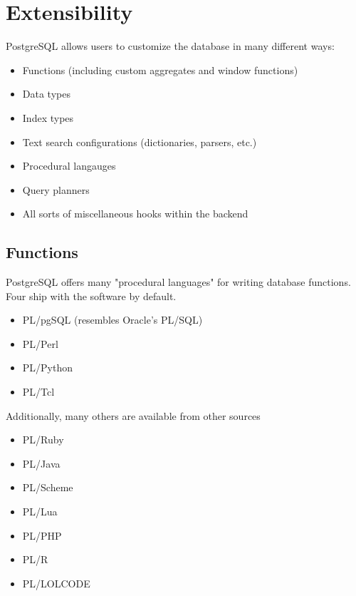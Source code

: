 \documentclass[svgnames]{beamer}
\begin{document}
\section{Extensibility}
\begin{frame}
PostgreSQL allows users to customize the database in many different ways:
\begin{itemize}
    \item Functions (including custom aggregates and window functions)
    \item Data types
    \item Index types
    \item Text search configurations (dictionaries, parsers, etc.)
    \item Procedural langauges
    \item Query planners
    \item All sorts of miscellaneous hooks within the backend
\end{itemize}
\end{frame}

\subsection{Functions}
\begin{frame}
PostgreSQL offers many "procedural languages" for writing database functions. Four ship with the software by default.
\begin{itemize}
    \item PL/pgSQL (resembles Oracle's PL/SQL)
    \item PL/Perl
    \item PL/Python
    \item PL/Tcl
\end{itemize}
Additionally, many others are available from other sources
\begin{itemize}
    \item PL/Ruby
    \item PL/Java
    \item PL/Scheme
    \item PL/Lua
    \item PL/PHP
    \item PL/R
    \item PL/LOLCODE
\end{itemize}
\end{frame}

\begin{frame}
\end{frame}
\end{document}
